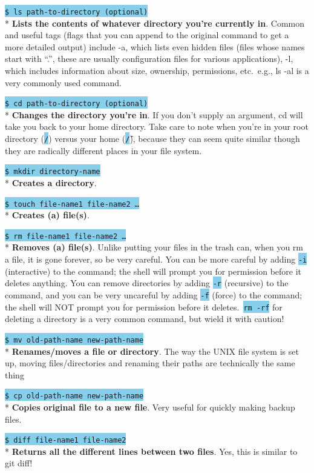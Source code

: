 \documentclass[fontsize=12pt,twoside=on,openright,parskip=half]{scrbook}
\newcommand{\code}[1]{\colorbox{skyblue}{\texttt{#1}}}
\begin{document}
\code{\$ ls path-to-directory (optional)} \\*
\textbf{Lists the contents of whatever directory you’re currently in}. Common
and useful tags (flags that you can append to the original command to get a
more detailed output) include -a, which lists even hidden files (files whose
names start with “.”, these are usually configuration files for various
applications), -l, which includes information about size, ownership,
permissions, etc.\ e.g., ls -al is a very commonly used command.

\code{\$ cd path-to-directory (optional)} \\*
\textbf{Changes the directory you’re in}. If you don’t supply an argument, cd
will take you back to your home directory. Take care to note when you’re in
your root directory (\code{/}) versus your home (\code{\~/}), because they can
seem quite similar though they are radically different places in your file
system.

\code{\$ mkdir directory-name} \\*
\textbf{Creates a directory}.

\code{\$ touch file-name1 file-name2 \ldots} \\*
\textbf{Creates (a) file(s)}.

\code{\$ rm file-name1 file-name2 \ldots} \\*
\textbf{Removes (a) file(s)}. Unlike putting your files in the trash can, when
you rm a file, it is gone forever, so be very careful. You can be more careful
by adding \code{-i} (interactive) to the command; the shell will prompt you for
permission before it deletes anything. You can remove directories by adding
\code{-r} (recursive) to the command, and you can be very uncareful by adding
\code{-f} (force) to the command; the shell will NOT prompt you for permission
before it deletes.\ \code{rm -rf} for deleting a directory is a very common
command, but wield it with caution!

\code{\$ mv old-path-name new-path-name} \\*
\textbf{Renames/moves a file or directory}. The way the UNIX file system is set
up, moving files/directories and renaming their paths are technically the same
thing

\code{\$ cp old-path-name new-path-name} \\*
\textbf{Copies original file to a new file}. Very useful for quickly making
backup files.

\code{\$ diff file-name1 file-name2} \\*
\textbf{Returns all the different lines between two files}. Yes, this is
similar to git diff!
\end{document}

